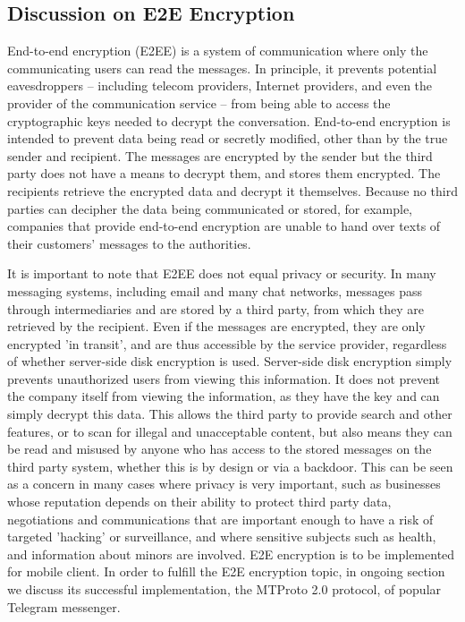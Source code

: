 \subsection{Discussion on E2E Encryption}\label{subsec:discussion-on-e2e-encryption-over-https-protocol}
End-to-end encryption (E2EE) is a system of communication where only the communicating users can read the messages.
In principle, it prevents potential eavesdroppers -- including telecom providers, Internet providers,
and even the provider of the communication service -- from being able to access the cryptographic keys needed to
decrypt the conversation.
End-to-end encryption is intended to prevent data being read or secretly modified, other than by the true sender and
recipient.
The messages are encrypted by the sender but the third party does not have a means to decrypt them, and stores them
encrypted.
The recipients retrieve the encrypted data and decrypt it themselves.
Because no third parties can decipher the data being communicated or stored, for example, companies that provide
end-to-end encryption are unable to hand over texts of their customers' messages to the authorities.

It is important to note that E2EE does not equal privacy or security.
In many messaging systems, including email and many chat networks, messages pass through intermediaries and are stored
by a third party, from which they are retrieved by the recipient.
Even if the messages are encrypted, they are only encrypted 'in transit', and are thus accessible by the service provider,
regardless of whether server-side disk encryption is used.
Server-side disk encryption simply prevents unauthorized users from viewing this information.
It does not prevent the company itself from viewing the information, as they have the key and can simply decrypt this data.
This allows the third party to provide search and other features, or to scan for illegal and unacceptable content,
but also means they can be read and misused by anyone who has access to the stored messages on the third party system,
whether this is by design or via a backdoor.
This can be seen as a concern in many cases where privacy is very important, such as businesses whose reputation
depends on their ability to protect third party data, negotiations and communications that are important enough to
have a risk of targeted 'hacking' or surveillance, and where sensitive subjects such as health, and information about
minors are involved.
E2E encryption is to be implemented for mobile client.
In order to fulfill the E2E encryption topic, in ongoing section we discuss its successful implementation, the MTProto 2.0
protocol, of popular Telegram messenger.

